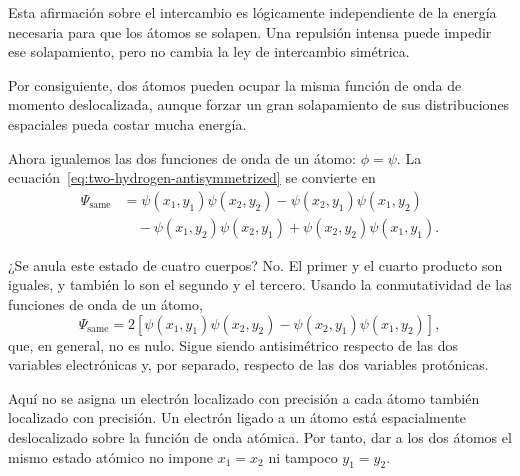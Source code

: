 Esta afirmación sobre el intercambio es lógicamente independiente de la energía necesaria para que los átomos se solapen. Una repulsión intensa puede impedir ese solapamiento, pero no cambia la ley de intercambio simétrica.

\begin{classroomqa}
\end{classroomqa}

Por consiguiente, dos átomos pueden ocupar la misma función de onda de momento deslocalizada, aunque forzar un gran solapamiento de sus distribuciones espaciales pueda costar mucha energía.

Ahora igualemos las dos funciones de onda de un átomo: \(\phi=\psi\). La ecuación~\eqref{eq:two-hydrogen-antisymmetrized} se convierte en
\begin{align}
\Psi_{\mathrm{same}}
&=\psi(x_1,y_1)\psi(x_2,y_2)
-\psi(x_2,y_1)\psi(x_1,y_2)\nonumber\\
&\quad
-\psi(x_1,y_2)\psi(x_2,y_1)
+\psi(x_2,y_2)\psi(x_1,y_1).
\end{align}

¿Se anula este estado de cuatro cuerpos? No. El primer y el cuarto producto son iguales, y también lo son el segundo y el tercero. Usando la conmutatividad de las funciones de onda de un átomo,
\begin{equation}
\Psi_{\mathrm{same}}
=
2\left[
\psi(x_1,y_1)\psi(x_2,y_2)
-\psi(x_2,y_1)\psi(x_1,y_2)
\right],
\label{eq:same-hydrogen-state}
\end{equation}
que, en general, no es nulo. Sigue siendo antisimétrico respecto de las dos variables electrónicas y, por separado, respecto de las dos variables protónicas.

Aquí no se asigna un electrón localizado con precisión a cada átomo también localizado con precisión. Un electrón ligado a un átomo está espacialmente deslocalizado sobre la función de onda atómica. Por tanto, dar a los dos átomos el mismo estado atómico no impone \(x_1=x_2\) ni tampoco \(y_1=y_2\).

